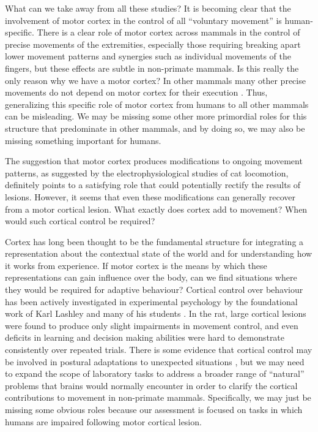 What can we take away from all these studies? It is becoming clear that the involvement of motor cortex in the control of all ``voluntary movement'' is human-specific. There is a clear role of motor cortex across mammals in the control of precise movements of the extremities, especially those requiring breaking apart lower movement patterns and synergies such as individual movements of the fingers, but these effects are subtle in non-primate mammals. Is this really the only reason why we have a motor cortex? In other mammals many other precise movements do not depend on motor cortex for their execution \cite{Kawai2015}. Thus, generalizing this specific role of motor cortex from humans to all other mammals can be misleading. We may be missing some other more primordial roles for this structure that predominate in other mammals, and by doing so, we may also be missing something important for humans.

The suggestion that motor cortex produces modifications to ongoing movement patterns, as suggested by the electrophysiological studies of cat locomotion, definitely points to a satisfying role that could potentially rectify the results of lesions. However, it seems that even these modifications can generally recover from a motor cortical lesion. What exactly does cortex add to movement? When would such cortical control be required?

Cortex has long been thought to be the fundamental structure for integrating a representation about the contextual state of the world and for understanding how it works from experience. If motor cortex is the means by which these representations can gain influence over the body, can we find situations where they would be required for adaptive behaviour? Cortical control over behaviour has been actively investigated in experimental psychology by the foundational work of Karl Lashley and many of his students \cite{Lashley1950a}. In the rat, large cortical lesions were found to produce only slight impairments in movement control, and even deficits in learning and decision making abilities were hard to demonstrate consistently over repeated trials. There is some evidence that cortical control may be involved in postural adaptations to unexpected situations \cite{Lashley1921a}, but we may need to expand the scope of laboratory tasks to address a broader range of ``natural'' problems that brains would normally encounter in order to clarify the cortical contributions to movement in non-primate mammals. Specifically, we may just be missing some obvious roles because our assessment is focused on tasks in which humans are impaired following motor cortical lesion.

